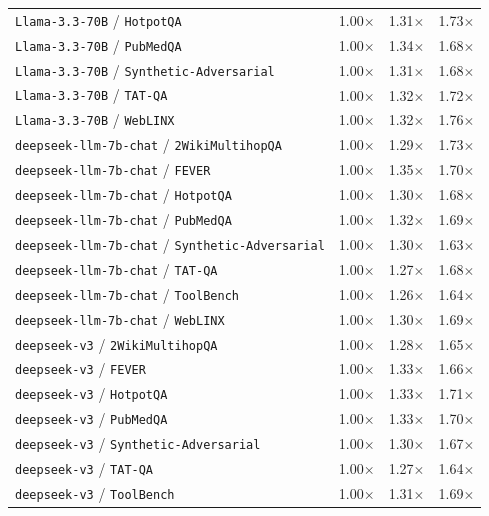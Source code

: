 \begin{longtable}{lccc}
\texttt{Llama-3.3-70B} / \texttt{HotpotQA} & 1.00$\times$ & 1.31$\times$ & 1.73$\times$ \\
\texttt{Llama-3.3-70B} / \texttt{PubMedQA} & 1.00$\times$ & 1.34$\times$ & 1.68$\times$ \\
\texttt{Llama-3.3-70B} / \texttt{Synthetic-Adversarial} & 1.00$\times$ & 1.31$\times$ & 1.68$\times$ \\
\texttt{Llama-3.3-70B} / \texttt{TAT-QA} & 1.00$\times$ & 1.32$\times$ & 1.72$\times$ \\
\texttt{Llama-3.3-70B} / \texttt{WebLINX} & 1.00$\times$ & 1.32$\times$ & 1.76$\times$ \\
\texttt{deepseek-llm-7b-chat} / \texttt{2WikiMultihopQA} & 1.00$\times$ & 1.29$\times$ & 1.73$\times$ \\
\texttt{deepseek-llm-7b-chat} / \texttt{FEVER} & 1.00$\times$ & 1.35$\times$ & 1.70$\times$ \\
\texttt{deepseek-llm-7b-chat} / \texttt{HotpotQA} & 1.00$\times$ & 1.30$\times$ & 1.68$\times$ \\
\texttt{deepseek-llm-7b-chat} / \texttt{PubMedQA} & 1.00$\times$ & 1.32$\times$ & 1.69$\times$ \\
\texttt{deepseek-llm-7b-chat} / \texttt{Synthetic-Adversarial} & 1.00$\times$ & 1.30$\times$ & 1.63$\times$ \\
\texttt{deepseek-llm-7b-chat} / \texttt{TAT-QA} & 1.00$\times$ & 1.27$\times$ & 1.68$\times$ \\
\texttt{deepseek-llm-7b-chat} / \texttt{ToolBench} & 1.00$\times$ & 1.26$\times$ & 1.64$\times$ \\
\texttt{deepseek-llm-7b-chat} / \texttt{WebLINX} & 1.00$\times$ & 1.30$\times$ & 1.69$\times$ \\
\texttt{deepseek-v3} / \texttt{2WikiMultihopQA} & 1.00$\times$ & 1.28$\times$ & 1.65$\times$ \\
\texttt{deepseek-v3} / \texttt{FEVER} & 1.00$\times$ & 1.33$\times$ & 1.66$\times$ \\
\texttt{deepseek-v3} / \texttt{HotpotQA} & 1.00$\times$ & 1.33$\times$ & 1.71$\times$ \\
\texttt{deepseek-v3} / \texttt{PubMedQA} & 1.00$\times$ & 1.33$\times$ & 1.70$\times$ \\
\texttt{deepseek-v3} / \texttt{Synthetic-Adversarial} & 1.00$\times$ & 1.30$\times$ & 1.67$\times$ \\
\texttt{deepseek-v3} / \texttt{TAT-QA} & 1.00$\times$ & 1.27$\times$ & 1.64$\times$ \\
\texttt{deepseek-v3} / \texttt{ToolBench} & 1.00$\times$ & 1.31$\times$ & 1.69$\times$ \\

\end{longtable}
